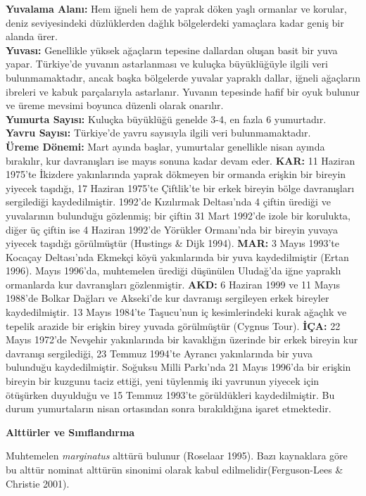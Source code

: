 \documentclass[
  letterpaper,
  DIV=11,
  numbers=noendperiod]{scrreprt}
\begin{document}
\textbf{Yuvalama Alanı:} Hem iğneli hem de yaprak döken yaşlı ormanlar
ve korular, deniz seviyesindeki düzlüklerden dağlık bölgelerdeki
yamaçlara kadar geniş bir alanda ürer.\\
\textbf{Yuvası:} Genellikle yüksek ağaçların tepesine dallardan oluşan
basit bir yuva yapar. Türkiye'de yuvanın astarlanması ve kuluçka
büyüklüğüyle ilgili veri bulunmamaktadır, ancak başka bölgelerde yuvalar
yapraklı dallar, iğneli ağaçların ibreleri ve kabuk parçalarıyla
astarlanır. Yuvanın tepesinde hafif bir oyuk bulunur ve üreme mevsimi
boyunca düzenli olarak onarılır.\\
\textbf{Yumurta Sayısı:} Kuluçka büyüklüğü genelde 3-4, en fazla 6
yumurtadır.\\
\textbf{Yavru Sayısı:} Türkiye'de yavru sayısıyla ilgili veri
bulunmamaktadır.\\
\textbf{Üreme Dönemi:} Mart ayında başlar, yumurtalar genellikle nisan
ayında bırakılır, kur davranışları ise mayıs sonuna kadar devam eder.
\textbf{KAR:} 11 Haziran 1975'te İkizdere yakınlarında yaprak dökmeyen
bir ormanda erişkin bir bireyin yiyecek taşıdığı, 17 Haziran 1975'te
Çiftlik'te bir erkek bireyin bölge davranışları sergilediği
kaydedilmiştir. 1992'de Kızılırmak Deltası'nda 4 çiftin ürediği ve
yuvalarının bulunduğu gözlenmiş; bir çiftin 31 Mart 1992'de izole bir
korulukta, diğer üç çiftin ise 4 Haziran 1992'de Yörükler Ormanı'nda bir
bireyin yuvaya yiyecek taşıdığı görülmüştür (Hustings \& Dijk 1994).
\textbf{MAR:} 3 Mayıs 1993'te Kocaçay Deltası'nda Ekmekçi köyü
yakınlarında bir yuva kaydedilmiştir (Ertan 1996). Mayıs 1996'da,
muhtemelen ürediği düşünülen Uludağ'da iğne yapraklı ormanlarda kur
davranışları gözlenmiştir. \textbf{AKD:} 6 Haziran 1999 ve 11 Mayıs
1988'de Bolkar Dağları ve Akseki'de kur davranışı sergileyen erkek
bireyler kaydedilmiştir. 13 Mayıs 1984'te Taşucu'nun iç kesimlerindeki
kurak ağaçlık ve tepelik arazide bir erişkin birey yuvada görülmüştür
(Cygnus Tour). \textbf{İÇA:} 22 Mayıs 1972'de Nevşehir yakınlarında bir
kavaklığın üzerinde bir erkek bireyin kur davranışı sergilediği, 23
Temmuz 1994'te Ayrancı yakınlarında bir yuva bulunduğu kaydedilmiştir.
Soğuksu Milli Parkı'nda 21 Mayıs 1996'da bir erişkin bireyin bir kuzgunu
taciz ettiği, yeni tüylenmiş iki yavrunun yiyecek için ötüşürken
duyulduğu ve 15 Temmuz 1993'te görüldükleri kaydedilmiştir. Bu durum
yumurtaların nisan ortasından sonra bırakıldığına işaret etmektedir.

\textbf{Alttürler ve Sınıflandırma}

Muhtemelen \emph{marginatus} alttürü bulunur (Roselaar 1995). Bazı
kaynaklara göre bu alttür nominat alttürün sinonimi olarak kabul
edilmelidir(Ferguson-Lees \& Christie 2001).
\end{document}

